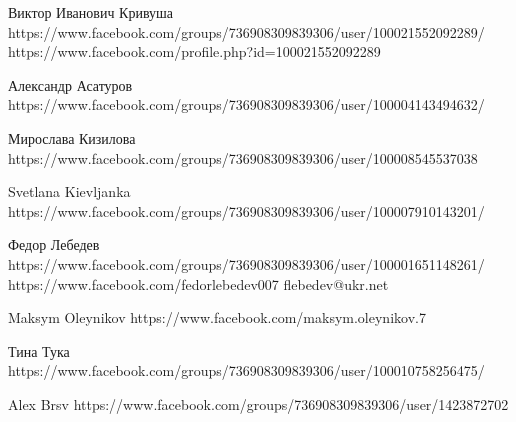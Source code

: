  
 
 
 
 

Виктор Иванович Кривуша
https://www.facebook.com/groups/736908309839306/user/100021552092289/
https://www.facebook.com/profile.php?id=100021552092289

Александр Асатуров
https://www.facebook.com/groups/736908309839306/user/100004143494632/

Мирослава Кизилова
https://www.facebook.com/groups/736908309839306/user/100008545537038

Svetlana Kievljanka
https://www.facebook.com/groups/736908309839306/user/100007910143201/

Федор Лебедев
https://www.facebook.com/groups/736908309839306/user/100001651148261/
https://www.facebook.com/fedorlebedev007
flebedev@ukr.net

Maksym Oleynikov
https://www.facebook.com/maksym.oleynikov.7

Тина Тука
https://www.facebook.com/groups/736908309839306/user/100010758256475/

Alex Brsv
https://www.facebook.com/groups/736908309839306/user/1423872702
